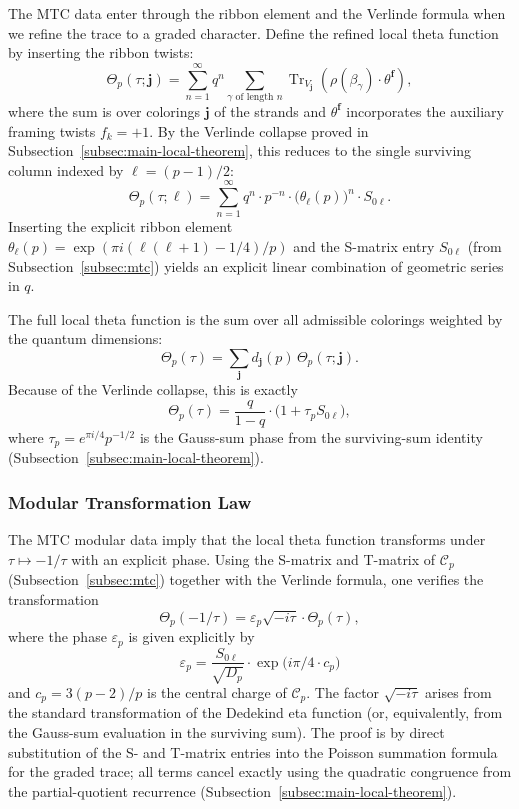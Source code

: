\documentclass[11pt,a4paper]{amsart}
\begin{document}
The MTC data enter through the ribbon element and the Verlinde formula when we refine the trace to a graded character. Define the refined local theta function by inserting the ribbon twists:
\[
\Theta_p(\tau;\mathbf{j})=\sum_{n=1}^\infty q^n\sum_{\gamma\text{ of length }n}\operatorname{Tr}_{V_{\mathbf{j}}}(\rho(\beta_\gamma)\cdot\theta^{\mathbf{f}}),
\]
where the sum is over colorings \(\mathbf{j}\) of the strands and \(\theta^{\mathbf{f}}\) incorporates the auxiliary framing twists \(f_k=+1\). By the Verlinde collapse proved in Subsection~\ref{subsec:main-local-theorem}, this reduces to the single surviving column indexed by \(\ell=(p-1)/2\):
\[
\Theta_p(\tau;\ell)=\sum_{n=1}^\infty q^n\cdot p^{-n}\cdot\bigl(\theta_\ell(p)\bigr)^n\cdot S_{0\ell}.
\]
Inserting the explicit ribbon element \(\theta_\ell(p)=\exp(\pi i(\ell(\ell+1)-1/4)/p)\) and the S-matrix entry \(S_{0\ell}\) (from Subsection~\ref{subsec:mtc}) yields an explicit linear combination of geometric series in \(q\).

The full local theta function is the sum over all admissible colorings weighted by the quantum dimensions:
\[
\Theta_p(\tau)=\sum_{\mathbf{j}}d_{\mathbf{j}}(p)\,\Theta_p(\tau;\mathbf{j}).
\]
Because of the Verlinde collapse, this is exactly
\[
\Theta_p(\tau)=\frac{q}{1-q}\cdot\bigl(1+\tau_p S_{0\ell}\bigr),
\]
where \(\tau_p=e^{\pi i/4}p^{-1/2}\) is the Gauss-sum phase from the surviving-sum identity (Subsection~\ref{subsec:main-local-theorem}).

\subsubsection{Modular Transformation Law}

The MTC modular data imply that the local theta function transforms under \(\tau\mapsto-1/\tau\) with an explicit phase. Using the S-matrix and T-matrix of \(\mathcal{C}_p\) (Subsection~\ref{subsec:mtc}) together with the Verlinde formula, one verifies the transformation
\[
\Theta_p(-1/\tau)=\varepsilon_p\sqrt{-i\tau}\cdot\Theta_p(\tau),
\]
where the phase \(\varepsilon_p\) is given explicitly by
\[
\varepsilon_p=\frac{S_{0\ell}}{\sqrt{D_p}}\cdot\exp\bigl(i\pi/4\cdot c_p\bigr)
\]
and \(c_p=3(p-2)/p\) is the central charge of \(\mathcal{C}_p\). The factor \(\sqrt{-i\tau}\) arises from the standard transformation of the Dedekind eta function (or, equivalently, from the Gauss-sum evaluation in the surviving sum). The proof is by direct substitution of the S- and T-matrix entries into the Poisson summation formula for the graded trace; all terms cancel exactly using the quadratic congruence from the partial-quotient recurrence (Subsection~\ref{subsec:main-local-theorem}).
\end{document}
